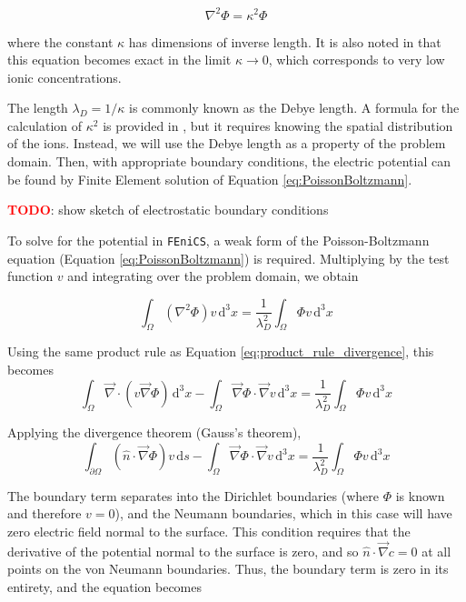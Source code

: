 \begin{equation}\label{eq:PoissonBoltzmann}
\nabla^2 \Phi = \kappa^2 \Phi
\end{equation}

where the constant $\kappa$ has dimensions of inverse length.
It is also noted in \cite{McQuarrie-StatMech} that this equation becomes exact
in the limit $\kappa \rightarrow 0$,
which corresponds to very low ionic concentrations.

The length $\lambda_D = 1/\kappa$ is commonly known as the Debye length.
A formula for the calculation of $\kappa^2$ is provided in \cite{McQuarrie-StatMech},
but it requires knowing the spatial distribution of the ions.
Instead, we will use the Debye length as a property of the problem domain.
Then, with appropriate boundary conditions,
the electric potential can be found by Finite Element solution of Equation \ref{eq:PoissonBoltzmann}.

\textcolor{red}{\textbf{TODO}}: show sketch of electrostatic boundary conditions

To solve for the potential in \texttt{FEniCS},
a weak form of the Poisson-Boltzmann equation (Equation \ref{eq:PoissonBoltzmann}) is required.
Multiplying by the test function $v$ and integrating over the problem domain, we obtain

\begin{equation}
\int_{\Omega} \left(\nabla^2 \Phi \right) v \,\mathrm{d}^3x = \frac{1}{\lambda_D^2} \int_{\Omega} \Phi v \,\mathrm{d}^3x
\end{equation}

Using the same product rule as Equation \ref{eq:product_rule_divergence}, this becomes
\begin{equation}
\int_{\Omega} \vec{\nabla} \cdot \left( v \vec{\nabla} \Phi \right) \,\mathrm{d}^3x
- \int_{\Omega} \vec{\nabla}\Phi \cdot \vec{\nabla}v \,\mathrm{d}^3x
= \frac{1}{\lambda_D^2} \int_{\Omega} \Phi v \,\mathrm{d}^3x
\end{equation}

Applying the divergence theorem (Gauss's theorem),
\begin{equation}
\int_{\partial\Omega} \left( \hat{n} \cdot \vec{\nabla} \Phi \right) v \,\mathrm{d}s
- \int_{\Omega} \vec{\nabla}\Phi \cdot \vec{\nabla}v \,\mathrm{d}^3x
= \frac{1}{\lambda_D^2} \int_{\Omega} \Phi v \,\mathrm{d}^3x
\end{equation}

The boundary term separates into the Dirichlet boundaries (where $\Phi$ is known and therefore $v=0$),
and the Neumann boundaries, which in this case will have zero electric field normal to the surface.
This condition requires that the derivative of the potential normal to the surface is zero,
and so $\hat{n} \cdot \vec{\nabla} c = 0$ at all points on the von Neumann boundaries.
Thus, the boundary term is zero in its entirety, and the equation becomes

